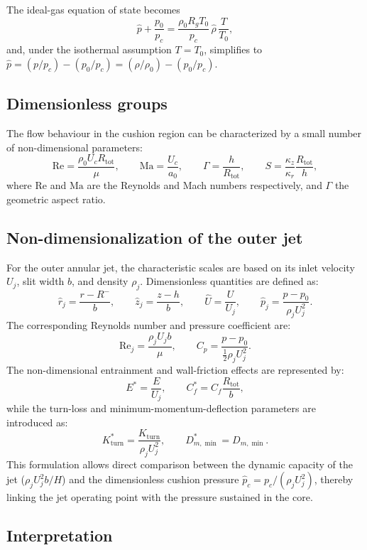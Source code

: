 \documentclass[11pt,a4paper]{article}
\begin{document}
The ideal-gas equation of state becomes
\[
\hat{p} + \frac{p_0}{p_c} = \frac{\rho_0 R_g T_0}{p_c} 
\, \hat{\rho} \, \frac{T}{T_0},
\]
and, under the isothermal assumption \(T = T_0\), simplifies to 
\(\hat{p} = (p/p_c) - (p_0/p_c) = (\rho / \rho_0) - (p_0/p_c)\).

\subsection{Dimensionless groups}

The flow behaviour in the cushion region can be characterized by a small number of non-dimensional parameters:
\[
\mathrm{Re} = \frac{\rho_0 U_c R_{\mathrm{tot}}}{\mu}, \qquad
\mathrm{Ma} = \frac{U_c}{a_0}, \qquad
\Gamma = \frac{h}{R_{\mathrm{tot}}}, \qquad
S = \frac{\kappa_z}{\kappa_r} \frac{R_{\mathrm{tot}}}{h},
\]
where \(\mathrm{Re}\) and \(\mathrm{Ma}\) are the Reynolds and Mach numbers respectively, and \(\Gamma\) the geometric aspect ratio.

\subsection{Non-dimensionalization of the outer jet}

For the outer annular jet, the characteristic scales are based on its inlet velocity \(U_j\), slit width \(b\), and density \(\rho_j\).  
Dimensionless quantities are defined as:
\[
\hat{r}_j = \frac{r - R^{-}}{b}, \qquad
\hat{z}_j = \frac{z - h}{b}, \qquad
\hat{U} = \frac{U}{U_j}, \qquad
\hat{p}_j = \frac{p - p_0}{\rho_j U_j^2}.
\]
The corresponding Reynolds number and pressure coefficient are:
\[
\mathrm{Re}_j = \frac{\rho_j U_j b}{\mu}, \qquad
C_p = \frac{p - p_0}{\tfrac{1}{2}\rho_j U_j^2}.
\]
The non-dimensional entrainment and wall-friction effects are represented by:
\[
E^* = \frac{E}{U_j}, \qquad
C_f^* = C_f \frac{R_{\mathrm{tot}}}{b},
\]
while the turn-loss and minimum-momentum-deflection parameters are introduced as:
\[
K_{\mathrm{turn}}^* = \frac{K_{\mathrm{turn}}}{\rho_j U_j^2}, \qquad
D_{m,\min}^* = D_{m,\min}.
\]
This formulation allows direct comparison between the dynamic capacity of the jet
(\(\rho_j U_j^2 b / H\)) and the dimensionless cushion pressure \(\hat{p}_c = p_c / (\rho_j U_j^2)\),
thereby linking the jet operating point with the pressure sustained in the core.

\subsection{Interpretation}
\end{document}
